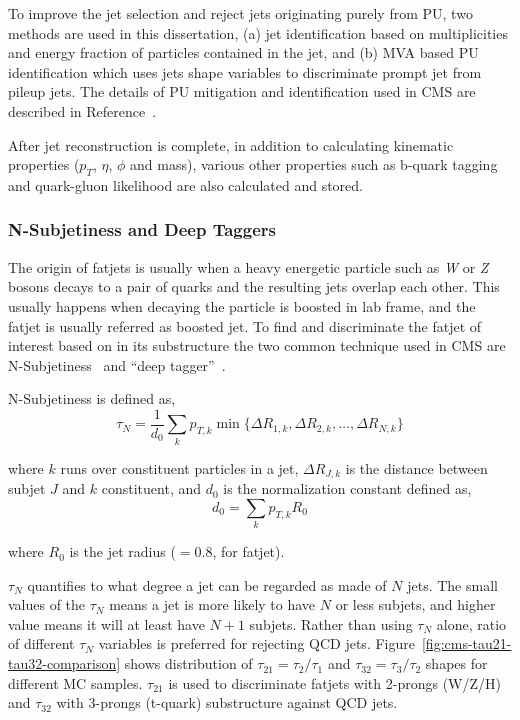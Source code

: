 To improve the jet selection and reject jets originating purely from \gls{PU},
two methods are used in this dissertation, (a) jet identification based on
multiplicities and energy fraction of particles contained in the jet,
and (b) \gls{MVA} based \gls{PU} identification which uses jets shape
variables to discriminate prompt jet from pileup jets.
The details of \gls{PU} mitigation and identification used in
\gls{CMS} are described in Reference~\cite{cms-jme-pu-run2}.

After jet reconstruction is complete, in addition to calculating kinematic
properties (\( p_T \), \( \eta \), \( \phi \) and mass), various other
properties such as b-quark tagging and quark-gluon likelihood are also
calculated and stored.

\subsubsection{
  N-Subjetiness and Deep Taggers
}\label{ch_reco:subjetiness}

The origin of fatjets is usually when a heavy energetic particle
such as \textit{W} or \textit{Z} bosons decays to a pair of quarks
and the resulting jets overlap each other. This usually happens
when decaying the particle is boosted in lab frame, and the fatjet
is usually referred as boosted jet.
To find and discriminate the fatjet of interest based on in its substructure
the two common technique used in \gls{CMS} are N-Subjetiness~\cite{tau21-paper}
and ``deep tagger''~\cite{cms-jme-deep-tagger}.

N-Subjetiness is defined as,
%
\begin{equation}
  \tau_N = \frac{1}{d_0} \sum_k p_{T,k} \min \{ \Delta R_{1,k}, \Delta R_{2,k}, \ldots , \Delta R_{N,k} \}
\end{equation}

where \( k \) runs over constituent particles in a jet, \( \Delta R_{J,k} \)
is the distance between subjet \( J \) and \( k \) constituent, and \( d_0 \)
is the normalization constant defined as,
%
\begin{equation}
  d_0 = \sum_k p_{T,k} R_0
\end{equation}

where \( R_0 \) is the jet radius (\(= 0.8\), for fatjet).

\( \tau_N \) quantifies to what degree a jet can be regarded as made of \( N \) jets.
The small values of the \( \tau_N \) means a jet is more likely to have
\( N \) or less subjets, and higher value means it will at least have \( N + 1\)
subjets. Rather than using \( \tau_N \) alone, ratio of different \( \tau_N \)
variables is preferred for rejecting \gls{QCD} jets.
Figure~\ref{fig:cms-tau21-tau32-comparison} shows distribution of
\( \tau_{21} = \tau_{2}/\tau_{1}\) and \( \tau_{32} = \tau_{3}/\tau_{2}\) shapes
for different \gls{MC} samples.
\( \tau_{21} \) is used to discriminate fatjets with 2-prongs (W/Z/H)
and \( \tau_{32} \) with 3-prongs (t-quark) substructure against QCD jets.

